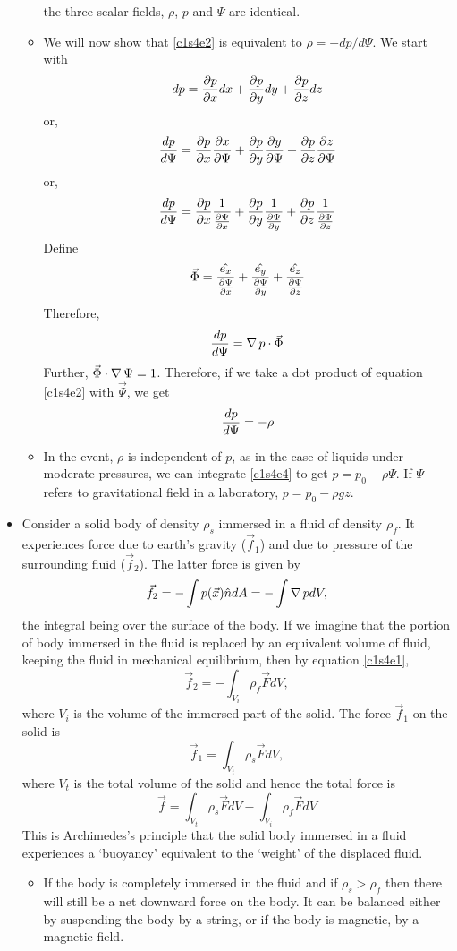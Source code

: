 \begin{itemize}
\begin{itemize}
the three scalar fields, $\rho$, $p$ and $\Psi$ are identical.
\item We will now show that \eqref{c1s4e2} is equivalent to $\rho = -dp/d\Psi$. We start with
\[
dp = \frac{\partial{p}}{\partial{x}}dx + \frac{\partial{p}}{\partial{y}}dy + \frac{\partial{p}}{\partial{z}}dz
\]
or,
\[
\frac{d{p}}{d{\Psi}} = \frac{\partial{p}}{\partial{x}}\frac{\partial{x}}{\partial{\Psi}} + \frac{\partial{p}}{\partial{y}}\frac{\partial{y}}{\partial{\Psi}} + \frac{\partial{p}}{\partial{z}}\frac{\partial{z}}{\partial{\Psi}}
\]
or,
\[
\frac{d{p}}{d{\Psi}} = \frac{\partial{p}}{\partial{x}}\frac{1}{\frac{\partial{\Psi}}{\partial{x}}} + \frac{\partial{p}}{\partial{y}}\frac{1}{\frac{\partial{\Psi}}{\partial{y}}} + \frac{\partial{p}}{\partial{z}}\frac{1}{\frac{\partial{\Psi}}{\partial{z}}}
\]
Define
\[
\vec{\Phi} = \frac{\hat{e_{x}}}{\frac{\partial{\Psi}}{\partial{x}}} + \frac{\hat{e_{y}}}{\frac{\partial{\Psi}}{\partial{y}}} + \frac{\hat{e_{z}}}{\frac{\partial{\Psi}}{\partial{z}}}
\]
Therefore,
\[
\frac{d{p}}{d{\Psi}} = \operatorname{\nabla}{p}\cdot\vec{\Phi}
\]
Further, $\vec{\Phi}\cdot\operatorname{\nabla}{\Psi} = 1$. Therefore, if we take a dot product of equation \eqref{c1s4e2} with $\vec{\Psi}$, we get
\begin{equation}\label{c1s4e4}
\frac{d{p}}{d{\Psi}} = -\rho
\end{equation}
\item In the event, $\rho$ is independent of $p$, as in the case of liquids under moderate pressures, we can integrate \eqref{c1s4e4} to get $p = p_0 - \rho\Psi$. If $\Psi$ refers to
gravitational field in a laboratory, $p = p_0 - \rho gz$.
\end{itemize}

\item Consider a solid body of density $\rho_s$ immersed in a fluid of density $\rho_f$. It experiences force due to earth's gravity ($\vec{f}_1$) and due to pressure of the surrounding 
fluid ($\vec{f}_2$). The latter force is given by 
\[
\vec{f}_2 = -\int p(\vec{x})\hat{n} dA = -\int \operatorname{\nabla}{p} dV,
\]
the integral being over the surface of the body. If we imagine that the portion of body immersed in the fluid is replaced by an equivalent volume of fluid, keeping the fluid in mechanical 
equilibrium, then by equation \eqref{c1s4e1}, 
\[
\vec{f}_2 = -\int_{V_i} \rho_f\vec{F}dV,
\]
where $V_i$ is the volume of the immersed part of the solid. The force $\vec{f}_1$ on the solid is
\[
\vec{f}_1 = \int_{V_t} \rho_s\vec{F}dV,
\]
where $V_t$ is the total volume of the solid and hence the total force is
\begin{equation}\label{c1s4e5}
\vec{f} = \int_{V_t} \rho_s\vec{F}dV - \int_{V_i} \rho_f\vec{F}dV
\end{equation}
This is Archimedes's principle that the solid body immersed in a fluid experiences a \enquote*{buoyancy} equivalent to the \enquote*{weight} of the displaced fluid.
\begin{itemize}
\item If the body is completely immersed in the fluid and if $\rho_s > \rho_f$ then there will still be a net downward force on the body. It can be balanced either by suspending the body
by a string, or if the body is magnetic, by a magnetic field.
\end{itemize}


\end{itemize}
